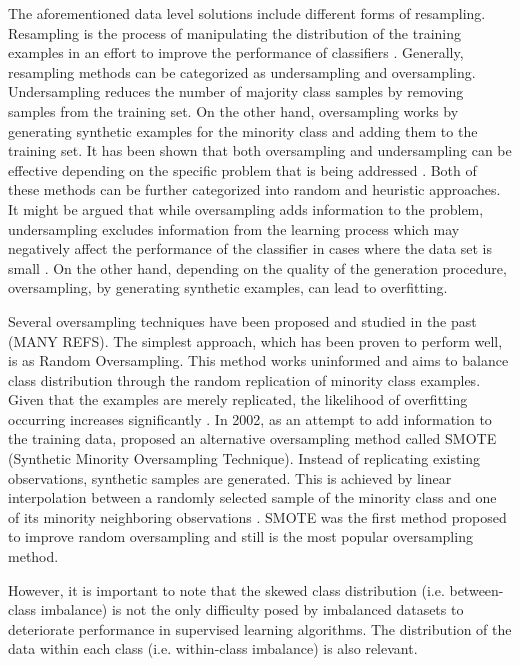 \documentclass[parskip=full]{scrartcl}
\begin{document}
The aforementioned data level solutions include different forms of resampling.  
Resampling is the process of manipulating the distribution of the training 
examples in an effort to improve the performance of classifiers \cite{Jo2004}. 
Generally, resampling methods can be categorized as undersampling and 
oversampling. Undersampling reduces the number of majority class samples by 
removing samples from the training set. On the other hand, oversampling works 
by generating synthetic examples for the minority class and adding them to the 
training set. It has been shown that both oversampling and undersampling can be 
effective depending on the specific problem that is being addressed 
\cite{Chawla2002}. Both of these methods can be further categorized into random 
and heuristic approaches. It might be argued that while oversampling adds 
information to the problem, undersampling excludes information from the 
learning process which may negatively affect the performance of the classifier 
in cases where the data set is small \cite{He2008}. On the other hand, 
depending on the quality of the generation procedure, oversampling, by 
generating synthetic examples, can lead to overfitting.

Several oversampling techniques have been proposed and studied in the past 
(MANY REFS). The simplest approach, which has been proven to perform well, is 
as Random Oversampling. This method works uninformed and aims to balance class 
distribution through the random replication of minority class examples. Given 
that the examples are merely replicated, the likelihood of overfitting 
occurring increases significantly \cite{Batista2004}. In 2002, as an attempt to 
add information to the training data, \cite{Chawla2002} proposed an alternative 
oversampling method called SMOTE (Synthetic Minority Oversampling Technique). 
Instead of replicating existing observations, synthetic samples are generated. 
This is achieved by linear interpolation between a randomly selected sample of 
the minority class and one of its minority neighboring observations 
\cite{Douzas2018} \cite{Fernandez2018} \cite{Liu2007}. SMOTE was the first 
method proposed to improve random oversampling and still is the most popular 
oversampling method. 

However, it is important to note that the skewed class distribution (i.e. between-class imbalance) is not the only difficulty posed by imbalanced datasets to deteriorate performance in supervised learning algorithms. The distribution of the data within each class (i.e. within-class imbalance) is also relevant. 
\end{document}
